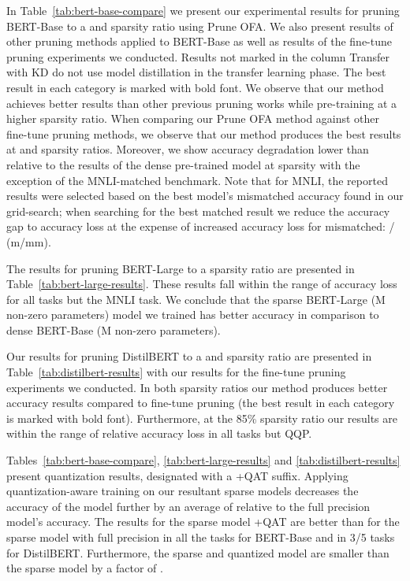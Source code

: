 \documentclass{article}
\begin{document}
In Table~\ref{tab:bert-base-compare} we present our experimental results for pruning BERT-Base to a  and  sparsity ratio using Prune OFA.
We also present results of other pruning methods applied to BERT-Base as well as results of the fine-tune pruning experiments we conducted.
Results not marked in the column Transfer with KD do not use model distillation in the transfer learning phase.
The best result in each category is marked with bold font.
We observe that our method achieves better results than other previous pruning works while pre-training at a higher sparsity ratio.
When comparing our Prune OFA method against other fine-tune pruning methods, we observe that our method produces the best results at  and  sparsity ratios.
Moreover, we show accuracy degradation lower than  relative to the results of the dense pre-trained model at  sparsity with the exception of the MNLI-matched benchmark.
Note that for MNLI, the reported results were selected based on the best model's mismatched accuracy found in our grid-search; when searching for the best matched result we reduce the accuracy gap to  accuracy loss at the expense of increased accuracy loss for mismatched: / (m/mm).

The results for pruning BERT-Large to a  sparsity ratio are presented in Table~\ref{tab:bert-large-results}.
These results fall within the range of  accuracy loss for all tasks but the MNLI task.
We conclude that the  sparse BERT-Large (M non-zero parameters) model we trained has better accuracy in comparison to dense BERT-Base (M non-zero parameters).

Our results for pruning DistilBERT to a  and  sparsity ratio are presented in Table~\ref{tab:distilbert-results} with our results for the fine-tune pruning experiments we conducted.
In both sparsity ratios our method produces better accuracy results compared to fine-tune pruning (the best result in each category is marked with bold font).
Furthermore, at the 85\% sparsity ratio our results are within the range of  relative accuracy loss in all tasks but QQP.

Tables~\ref{tab:bert-base-compare}, \ref{tab:bert-large-results} and \ref{tab:distilbert-results} present quantization results, designated with a +QAT suffix.
Applying quantization-aware training on our resultant sparse models decreases the accuracy of the model further by an average of  relative to the full precision model's accuracy.
The results for the  sparse model +QAT are better than for the  sparse model with full precision in all the tasks for BERT-Base and in 3/5 tasks for DistilBERT.
Furthermore, the  sparse and quantized model are smaller than the  sparse model by a factor of .
\end{document}
